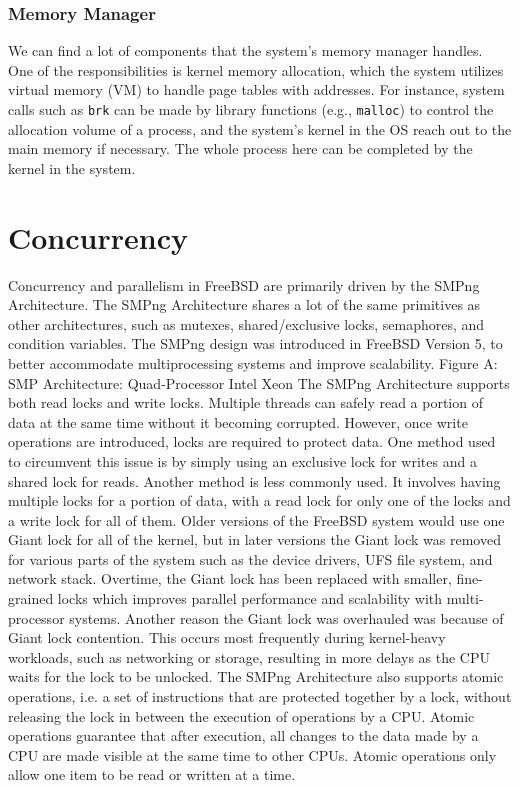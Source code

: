 \documentclass[12pt, dvipsnames, a4paper]{article}
\newcommand{\code}[1]{\texttt{#1}}
\begin{document}
\subsubsection{Memory Manager}
We can find a lot of components that the system’s memory manager handles. One of the responsibilities is kernel memory allocation, which the system utilizes virtual memory (VM) to handle page tables with addresses. For instance, system calls such as \code{brk} can be made by library functions (e.g., \code{malloc}) to control the allocation volume of a process, and the system’s kernel in the OS reach out to the main memory if necessary. The whole process here can be completed by the kernel in the system.\par

\section{Concurrency}
Concurrency and parallelism in FreeBSD are primarily driven by the SMPng Architecture. The SMPng Architecture shares a lot of the same primitives as other architectures, such as mutexes, shared/exclusive locks, semaphores, and condition variables. The SMPng design was introduced in FreeBSD Version 5, to better accommodate multiprocessing systems and improve scalability.
Figure A: SMP Architecture: Quad-Processor Intel Xeon
The SMPng Architecture supports both read locks and write locks. Multiple threads can safely read a portion of data at the same time without it becoming corrupted. However, once write operations are introduced, locks are required to protect data. One method used to circumvent this issue is by simply using an exclusive lock for writes and a shared lock for reads. Another method is less commonly used. It involves having multiple locks for a portion of data, with a read lock for only one of the locks and a write lock for all of them.
Older versions of the FreeBSD system would use one Giant lock for all of the kernel, but in later versions the Giant lock was removed for various parts of the system such as the device drivers, UFS file system, and network stack. Overtime, the Giant lock has been replaced with smaller, fine-grained locks which improves parallel performance and scalability with multi-processor systems. Another reason the Giant lock was overhauled was because of Giant lock contention. This occurs most frequently during kernel-heavy workloads, such as networking or storage, resulting in more delays as the CPU waits for the lock to be unlocked.
The SMPng Architecture also supports atomic operations, i.e. a set of instructions that are protected together by a lock, without releasing the lock in between the execution of operations by a CPU. Atomic operations guarantee that after execution, all changes to the data made by a CPU are made visible at the same time to other CPUs. Atomic operations only allow one item to be read or written at a time.
\end{document}
